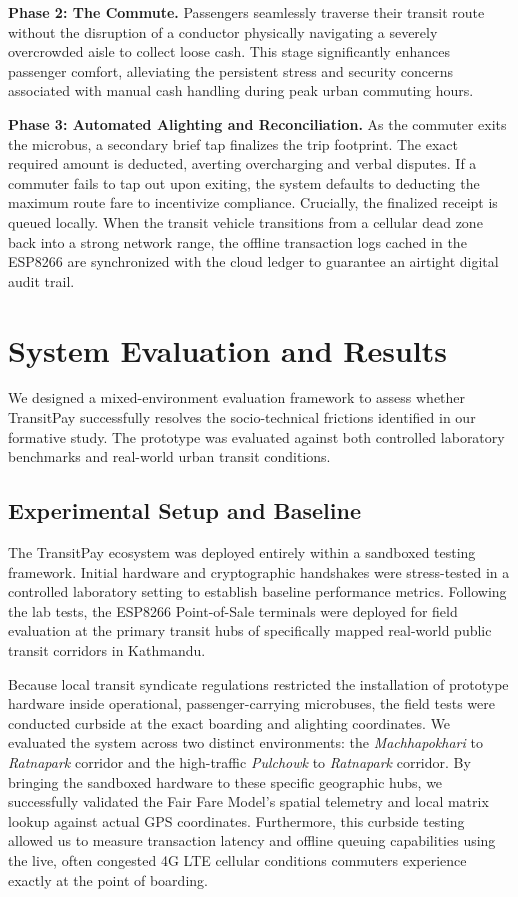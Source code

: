 \documentclass[manuscript,review,anonymous]{acmart}
\begin{document}
\textbf{Phase 2: The Commute.} Passengers seamlessly traverse their transit route without the disruption of a conductor physically navigating a severely overcrowded aisle to collect loose cash. This stage significantly enhances passenger comfort, alleviating the persistent stress and security concerns associated with manual cash handling during peak urban commuting hours.

\textbf{Phase 3: Automated Alighting and Reconciliation.} As the commuter exits the microbus, a secondary brief tap finalizes the trip footprint. The exact required amount is deducted, averting overcharging and verbal disputes. If a commuter fails to tap out upon exiting, the system defaults to deducting the maximum route fare to incentivize compliance. Crucially, the finalized receipt is queued locally. When the transit vehicle transitions from a cellular dead zone back into a strong network range, the offline transaction logs cached in the ESP8266 are synchronized with the cloud ledger to guarantee an airtight digital audit trail.

\section{System Evaluation and Results}
We designed a mixed-environment evaluation framework to assess whether TransitPay successfully resolves the socio-technical frictions identified in our formative study. The prototype was evaluated against both controlled laboratory benchmarks and real-world urban transit conditions.

\subsection{Experimental Setup and Baseline}
The TransitPay ecosystem was deployed entirely within a sandboxed testing framework. Initial hardware and cryptographic handshakes were stress-tested in a controlled laboratory setting to establish baseline performance metrics. Following the lab tests, the ESP8266 Point-of-Sale terminals were deployed for field evaluation at the primary transit hubs of specifically mapped real-world public transit corridors in Kathmandu.

Because local transit syndicate regulations restricted the installation of prototype hardware inside operational, passenger-carrying microbuses, the field tests were conducted curbside at the exact boarding and alighting coordinates. We evaluated the system across two distinct environments: the \textit{Machhapokhari} to \textit{Ratnapark} corridor and the high-traffic \textit{Pulchowk} to \textit{Ratnapark} corridor. By bringing the sandboxed hardware to these specific geographic hubs, we successfully validated the Fair Fare Model's spatial telemetry and local matrix lookup against actual GPS coordinates. Furthermore, this curbside testing allowed us to measure transaction latency and offline queuing capabilities using the live, often congested 4G LTE cellular conditions commuters experience exactly at the point of boarding.
\end{document}
